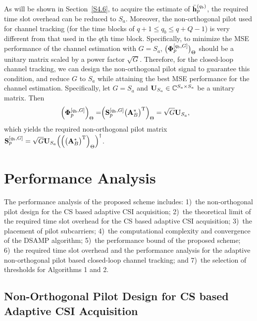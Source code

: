 \documentclass[final]{IEEEtran}
\begin{document}
 As will be shown in Section~\ref{S4.6}, to acquire the estimate of $\bar{\bf h}_p^{(q_b)}$,
 the required time slot overhead can be reduced to $S_a$. Moreover, the non-orthogonal pilot
 used for channel tracking (for the time blocks of $q+1\le q_b\le q+Q-1$) is very different
 from that used in the $q$th time block. Specifically, to minimize the MSE performance of the
 channel estimation with $G=S_a$, $\big( {\bf{\Phi}}_p^{[q_b,G]} \big)_{\Theta}$ should be a
 unitary matrix scaled by a power factor $\sqrt{G}$. Therefore, for the closed-loop channel
 tracking, we can design the non-orthogonal pilot signal to guarantee this condition, and
 reduce $G$ to $S_a$ while attaining the best MSE performance for the channel estimation.
 Specifically, let $G=S_a$ and ${\bf U}_{S_a}\in \mathbb{C}^{S_a\times S_a}$ be a unitary
 matrix. Then
\begin{align}\label{eq14}
 \Big( {\bf{\Phi}}_p^{[q_b,G]} \Big)_{\Theta} =& \Big( {\bf S}_p^{[q_b,G]} \big(
 {\bf A}_B^{*}\big)^{\rm T} \Big)_{\Theta} = \sqrt{G}{\bf U}_{S_a} ,
\end{align}
 which yields the required non-orthogonal pilot matrix ${\bf S}_p^{[q_b,G]}=\sqrt{G}
 {\bf U}_{S_a}\Big( \Big( \big( {\bf A}_B^{*} \big)^{\rm T} \Big)_{\Theta} \Big)^{\dag}$.

\section{Performance Analysis}\label{S4}

 The performance analysis of the proposed scheme includes: 1)~the non-orthogonal pilot design
 for the CS based adaptive CSI acquisition; 2)~the theoretical limit of the required time slot
 overhead for the CS based adaptive CSI acquisition; 3)~the placement of pilot subcarriers;
 4)~the computational complexity and convergence of the DSAMP algorithm; 5)~the performance
 bound of the proposed scheme; 6)~the required time slot overhead and the performance analysis
 for the adaptive non-orthogonal pilot based closed-loop channel tracking; and 7)~the selection
 of thresholds for Algorithms 1 and 2.

\subsection{Non-Orthogonal Pilot Design for CS based Adaptive CSI Acquisition}\label{S4.1}
\end{document}
